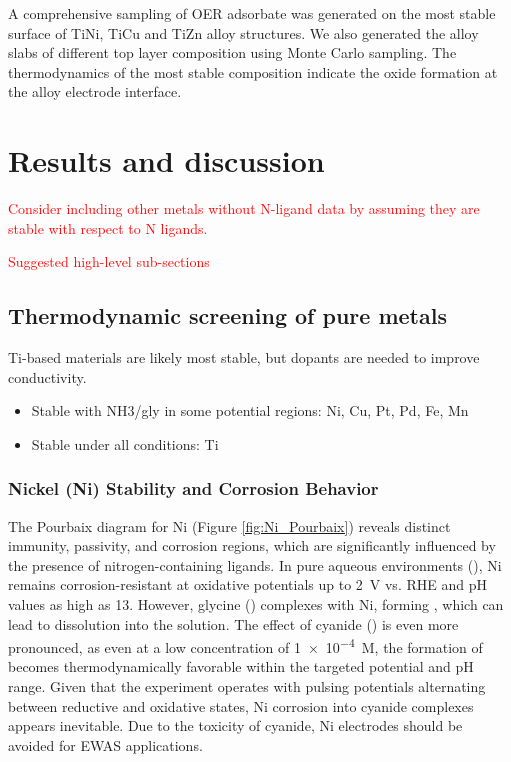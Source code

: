A comprehensive sampling of OER adsorbate was generated on the most stable surface of TiNi, TiCu and TiZn alloy structures. We also generated the alloy slabs of different top layer composition using Monte Carlo sampling. The thermodynamics of the most stable composition indicate the oxide formation at the alloy electrode interface. 


\section{Results and discussion}

\textcolor{red}{Consider including other metals without N-ligand data by assuming they are stable with respect to N ligands.}


\textcolor{red}{Suggested high-level sub-sections}
\subsection{Thermodynamic screening of pure metals}
Ti-based materials are likely most stable, but dopants are needed to improve conductivity.
\begin{itemize}
    \item Stable with NH3/gly in some potential regions: Ni, Cu, Pt, Pd, Fe, Mn
    \item Stable under all conditions: Ti
\end{itemize}

\subsubsection{Nickel (Ni) Stability and Corrosion Behavior}
The Pourbaix diagram for Ni (Figure \ref{fig:Ni_Pourbaix}) reveals distinct immunity, passivity, and corrosion regions, which are significantly influenced by the presence of nitrogen-containing ligands. In pure aqueous environments (), Ni remains corrosion-resistant at oxidative potentials up to 2~V vs. RHE and pH values as high as 13. However, glycine () complexes with Ni, forming \ce{[Ni(Gly)3^-]}, which can lead to dissolution into the solution. The effect of cyanide () is even more pronounced, as even at a low concentration of \num{1e-4}~M, the formation of \ce{[Ni(CN)4^2-]} becomes thermodynamically favorable within the targeted potential and pH range. Given that the experiment operates with pulsing potentials alternating between reductive and oxidative states, Ni corrosion into cyanide complexes appears inevitable. Due to the toxicity of cyanide\cite{Bhattacharya2009CyanideTreatment}, Ni electrodes should be avoided for EWAS applications.

